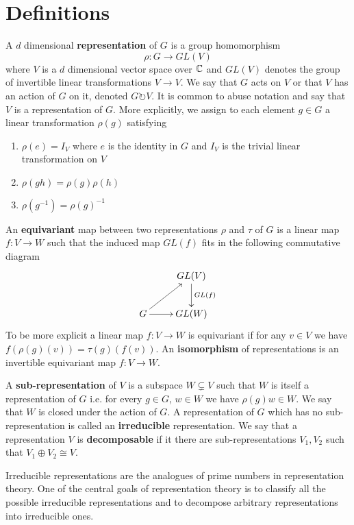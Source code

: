 \section{Definitions}
A $d$ dimensional \textbf{representation} of $G$ is a group homomorphism $$\rho: G \rightarrow GL(V)$$ where $V$ is a $d$ dimensional vector space over $\mathbb{C}$ and $GL(V)$ denotes the group of invertible linear transformations $V \rightarrow V$. We say that $G$ acts on $V$ or that $V$ has an action of $G$ on it, denoted $G \circlearrowright V$. It is common to abuse notation and say that $V$ is a representation of $G$. More explicitly, we assign to each element $g \in G$ a linear transformation $\rho(g)$ satisfying
\begin{enumerate}
	\item $\rho(e) = I_{V}$ where $e$ is the identity in $G$ and $I_V$ is the trivial linear transformation on $V$
	\item $\rho(gh) = \rho(g)\rho(h)$
	\item $\rho(g^{-1}) = \rho(g)^{-1}$
\end{enumerate}
An \textbf{equivariant} map between two representations $\rho$ and $\tau$ of $G$ is a linear map $f: V \rightarrow W$ such that the induced map $GL(f)$ fits in the following commutative diagram
\begin{align}
	\xymatrix{
	                 & GL(V) \ar^{GL(f)}[d] \\
	G \ar[ur] \ar[r] & GL(W)                \\
	}
\end{align}
To be more explicit a linear map $f:V \rightarrow W$ is equivariant if for any $v \in V$ we have $f(\rho(g)(v)) = \tau(g)(f(v))$. An \textbf{isomorphism} of representations is an invertible equivariant map $f: V \rightarrow W$.


A \textbf{sub-representation} of $V$ is a subspace $W \subsetneq V$ such that $W$ is itself a representation of $G$ i.e. for every $g \in G$, $w \in W$ we have $\rho(g)w \in W$. We say that $W$ is closed under the action of $G$. A representation of $G$ which has no sub-representation is called an \textbf{irreducible} representation. We say that a representation $V$ is \textbf{decomposable} if it there are sub-representations $V_1, V_2$ such that $V_1 \oplus V_2 \cong V$.

Irreducible representations are the analogues of prime numbers in representation theory. One of the central goals of representation theory is to classify all the possible irreducible representations and to decompose arbitrary representations into irreducible ones.










